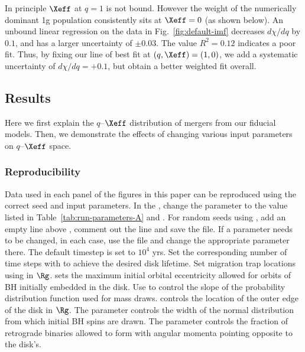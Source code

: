 In principle $\Xeff$ at $q=1$ is not bound.
However the weight of the numerically dominant 1g population consistently sits at $\Xeff=0$ (as shown below).
An unbound linear regression on the data in Fig.~\ref{fig:default-imf} decreases $d\chi/dq$ by $0.1$, and has a larger uncertainty of $\pm0.03$.
The value $R^2=0.12$ indicates a poor fit.
Thus, by fixing our line of best fit at $(q,\Xeff)=(1,0)$, we add a systematic uncertainty of $d\chi/dq=+0.1$, but obtain a better weighted fit overall.


\subsection{Results}
\label{sec:results-ch2}
Here we first explain the $q$--$\Xeff$ distribution of mergers from our fiducial models.
Then, we demonstrate the effects of changing various input parameters on $q$--$\Xeff$ space.

\subsubsection{Reproducibility}
Data used in each panel of the figures in this paper can be reproduced using the correct seed and input parameters.
In the , change the  parameter to the value listed in Table~\ref{tab:run-parameters-A} and .
For random seeds using , add an empty line above , comment out the  line and save the file.
If a parameter needs to be changed, in each case, use the  file and change the appropriate parameter there.
The default timestep is set to $10^4$ yrs.
Set the corresponding number of time steps with  to achieve the desired disk lifetime.
Set migration trap locations using  in $\Rg$.
 sets the maximum initial orbital eccentricity allowed for orbits of BH initially embedded in the disk.
Use  to control the slope of the probability distribution function used for mass draws.
 controls the location of the outer edge of the disk in $\Rg$.
The parameter  controls the width of the normal distribution from which initial BH spins are drawn.
The parameter  controls the fraction of retrograde binaries allowed to form with angular momenta pointing opposite to the disk's.

